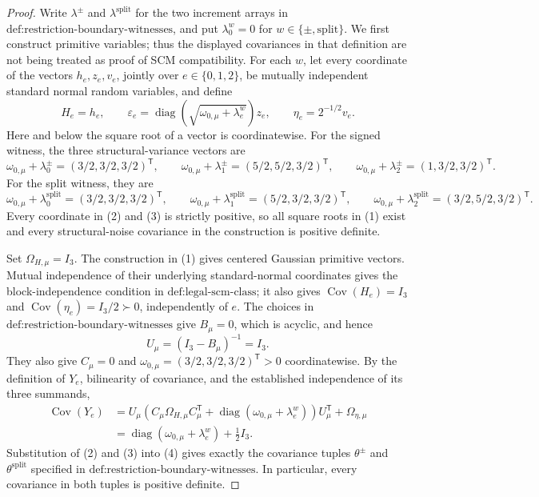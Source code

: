 \documentclass{article}
\begin{document}
\begin{proof}
Write \(\lambda^{\pm}\) and \(\lambda^{\mathrm{split}}\) for the two increment arrays in \(\text{def:restriction-boundary-witnesses}\), and put \(\lambda^w_0=0\) for \(w\in\{\pm,\mathrm{split}\}\).  We first construct primitive variables; thus the displayed covariances in that definition are not being treated as proof of SCM compatibility.  For each \(w\), let every coordinate of the vectors \(h_e,z_e,v_e\), jointly over \(e\in\{0,1,2\}\), be mutually independent standard normal random variables, and define
\[
 H_e=h_e,\qquad
 \varepsilon_e=\operatorname{diag}\!\left(\sqrt{\omega_{0,\mu}+\lambda^w_e}\right)z_e,
 \qquad
 \eta_e=2^{-1/2}v_e. \tag{1}
\]
Here and below the square root of a vector is coordinatewise.  For the signed witness, the three structural-variance vectors are
\[
 \omega_{0,\mu}+\lambda^{\pm}_0=(3/2,3/2,3/2)^{\mathsf T},\qquad
 \omega_{0,\mu}+\lambda^{\pm}_1=(5/2,5/2,3/2)^{\mathsf T},\qquad
 \omega_{0,\mu}+\lambda^{\pm}_2=(1,3/2,3/2)^{\mathsf T}. \tag{2}
\]
For the split witness, they are
\[
 \omega_{0,\mu}+\lambda^{\mathrm{split}}_0=(3/2,3/2,3/2)^{\mathsf T},\qquad
 \omega_{0,\mu}+\lambda^{\mathrm{split}}_1=(5/2,3/2,3/2)^{\mathsf T},\qquad
 \omega_{0,\mu}+\lambda^{\mathrm{split}}_2=(3/2,5/2,3/2)^{\mathsf T}. \tag{3}
\]
Every coordinate in (2) and (3) is strictly positive, so all square roots in (1) exist and every structural-noise covariance in the construction is positive definite.

Set \(\Omega_{H,\mu}=I_3\).  The construction in (1) gives centered Gaussian primitive vectors.  Mutual independence of their underlying standard-normal coordinates gives the block-independence condition in \(\text{def:legal-scm-class}\); it also gives \(\operatorname{Cov}(H_e)=I_3\) and \(\operatorname{Cov}(\eta_e)=I_3/2\succ0\), independently of \(e\).  The choices in \(\text{def:restriction-boundary-witnesses}\) give \(B_\mu=0\), which is acyclic, and hence
\[
 U_\mu=(I_3-B_\mu)^{-1}=I_3.
\]
They also give \(C_\mu=0\) and \(\omega_{0,\mu}=(3/2,3/2,3/2)^{\mathsf T}>0\) coordinatewise.  By the definition of \(Y_e\), bilinearity of covariance, and the established independence of its three summands,
\[
 \begin{aligned}
 \operatorname{Cov}(Y_e)
 &=U_\mu\!\left(C_\mu\Omega_{H,\mu}C_\mu^{\mathsf T}
   +\operatorname{diag}(\omega_{0,\mu}+\lambda^w_e)\right)U_\mu^{\mathsf T}
   +\Omega_{\eta,\mu}\\
 &=\operatorname{diag}(\omega_{0,\mu}+\lambda^w_e)+\tfrac12 I_3. 
 \end{aligned} \tag{4}
\]
Substitution of (2) and (3) into (4) gives exactly the covariance tuples \(\theta^{\pm}\) and \(\theta^{\mathrm{split}}\) specified in \(\text{def:restriction-boundary-witnesses}\).  In particular, every covariance in both tuples is positive definite.


\end{proof}
\end{document}
